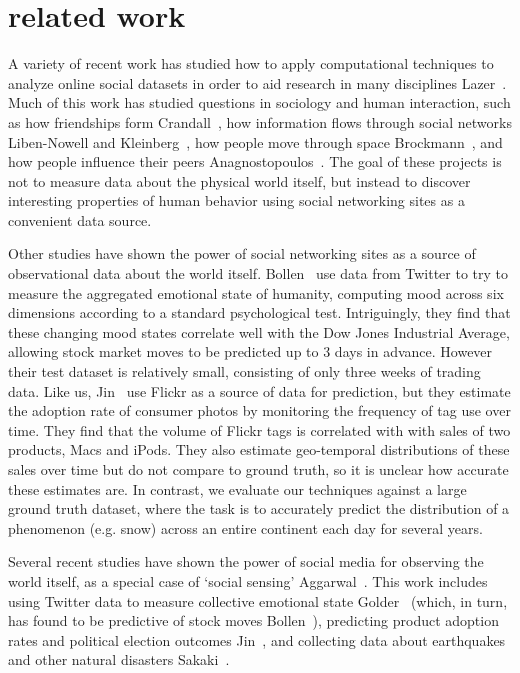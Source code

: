 \section{related work}
\label{sec:relatedwork}


A variety of recent work has studied how to apply computational
techniques to analyze online social datasets in order to aid research
in many disciplines Lazer\etal~\cite{lazer09}. Much of this work has studied
questions in sociology and human interaction, such as how friendships
form Crandall\etal~\cite{feedback08kdd}, how information flows through social
networks Liben-Nowell and Kleinberg~\cite{libennowell08}, how people move through
space Brockmann\etal~\cite{brockmann06}, and how people influence their
peers Anagnostopoulos\etal~\cite{anagnostpopoulos08}.  The goal of these projects is not to
measure data about the physical world itself, but instead to discover
interesting properties of human behavior using social networking sites
as a convenient data source.

Other studies have shown the power of social networking sites as a
source of observational data about the world itself.  Bollen\etal~\cite{bollen11twitter} use data from Twitter to try to measure
the aggregated emotional state of humanity, computing mood across six
dimensions according to a standard psychological
test. Intriguingly, they find that these changing mood states
correlate well with the Dow Jones Industrial Average, allowing stock
market moves to be predicted up to 3 days in advance.  However their
test dataset is relatively small, consisting of only three weeks of
trading data.  Like us, Jin\etal~\cite{jin10prediction} use
Flickr as a source of data for prediction, but they estimate the
adoption rate of consumer photos by monitoring the frequency of tag
use over time. They find that the volume of Flickr tags is 
correlated  with with sales of two products, Macs and iPods. They also
estimate geo-temporal distributions of these sales over time but do
not compare to ground truth, so it is unclear how accurate these
estimates are. In contrast, we evaluate our techniques against a large
ground truth dataset, where the task is to accurately predict the
distribution of a phenomenon (e.g. snow) across an entire continent 
each day for several years.


Several recent studies have shown the power of social media  for observing
the world itself, as a special case of `social sensing' Aggarwal\etal~\cite{Aggarwal:2013vh}.
This work includes using Twitter data to measure collective emotional
state Golder\etal~\cite{Golder:2011cy} (which, in turn, has found to
be predictive of stock moves Bollen\etal~\cite{bollen11twitter}),
predicting product adoption rates and political election
outcomes Jin\etal~\cite{jin10prediction}, and collecting data about
earthquakes and other natural disasters Sakaki\etal~\cite{Sakaki:2010uv}.

